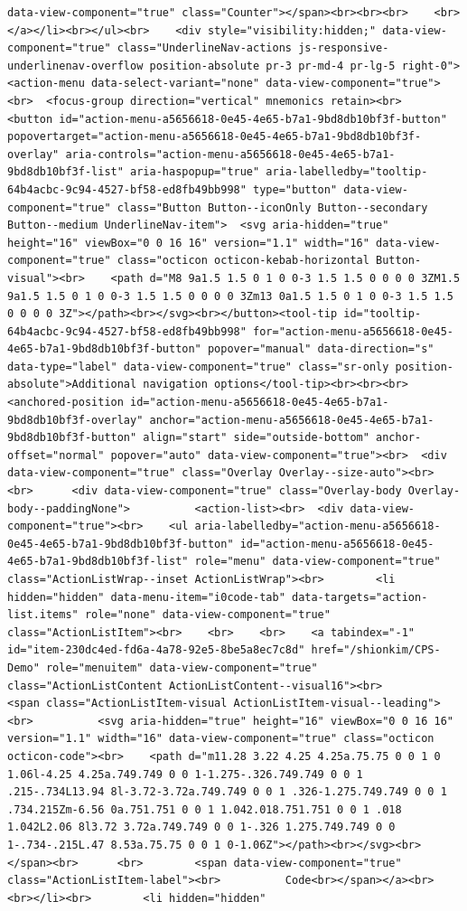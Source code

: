 \documentclass[
  letterpaper,
]{book}
\begin{document}
\begin{verbatim}
data-view-component="true" class="Counter"></span><br><br><br>    <br></a></li><br></ul><br>    <div style="visibility:hidden;" data-view-component="true" class="UnderlineNav-actions js-responsive-underlinenav-overflow position-absolute pr-3 pr-md-4 pr-lg-5 right-0">      <action-menu data-select-variant="none" data-view-component="true"><br>  <focus-group direction="vertical" mnemonics retain><br>    <button id="action-menu-a5656618-0e45-4e65-b7a1-9bd8db10bf3f-button" popovertarget="action-menu-a5656618-0e45-4e65-b7a1-9bd8db10bf3f-overlay" aria-controls="action-menu-a5656618-0e45-4e65-b7a1-9bd8db10bf3f-list" aria-haspopup="true" aria-labelledby="tooltip-64b4acbc-9c94-4527-bf58-ed8fb49bb998" type="button" data-view-component="true" class="Button Button--iconOnly Button--secondary Button--medium UnderlineNav-item">  <svg aria-hidden="true" height="16" viewBox="0 0 16 16" version="1.1" width="16" data-view-component="true" class="octicon octicon-kebab-horizontal Button-visual"><br>    <path d="M8 9a1.5 1.5 0 1 0 0-3 1.5 1.5 0 0 0 0 3ZM1.5 9a1.5 1.5 0 1 0 0-3 1.5 1.5 0 0 0 0 3Zm13 0a1.5 1.5 0 1 0 0-3 1.5 1.5 0 0 0 0 3Z"></path><br></svg><br></button><tool-tip id="tooltip-64b4acbc-9c94-4527-bf58-ed8fb49bb998" for="action-menu-a5656618-0e45-4e65-b7a1-9bd8db10bf3f-button" popover="manual" data-direction="s" data-type="label" data-view-component="true" class="sr-only position-absolute">Additional navigation options</tool-tip><br><br><br><anchored-position id="action-menu-a5656618-0e45-4e65-b7a1-9bd8db10bf3f-overlay" anchor="action-menu-a5656618-0e45-4e65-b7a1-9bd8db10bf3f-button" align="start" side="outside-bottom" anchor-offset="normal" popover="auto" data-view-component="true"><br>  <div data-view-component="true" class="Overlay Overlay--size-auto"><br>    <br>      <div data-view-component="true" class="Overlay-body Overlay-body--paddingNone">          <action-list><br>  <div data-view-component="true"><br>    <ul aria-labelledby="action-menu-a5656618-0e45-4e65-b7a1-9bd8db10bf3f-button" id="action-menu-a5656618-0e45-4e65-b7a1-9bd8db10bf3f-list" role="menu" data-view-component="true" class="ActionListWrap--inset ActionListWrap"><br>        <li hidden="hidden" data-menu-item="i0code-tab" data-targets="action-list.items" role="none" data-view-component="true" class="ActionListItem"><br>    <br>    <br>    <a tabindex="-1" id="item-230dc4ed-fd6a-4a78-92e5-8be5a8ec7c8d" href="/shionkim/CPS-Demo" role="menuitem" data-view-component="true" class="ActionListContent ActionListContent--visual16"><br>        <span class="ActionListItem-visual ActionListItem-visual--leading"><br>          <svg aria-hidden="true" height="16" viewBox="0 0 16 16" version="1.1" width="16" data-view-component="true" class="octicon octicon-code"><br>    <path d="m11.28 3.22 4.25 4.25a.75.75 0 0 1 0 1.06l-4.25 4.25a.749.749 0 0 1-1.275-.326.749.749 0 0 1 .215-.734L13.94 8l-3.72-3.72a.749.749 0 0 1 .326-1.275.749.749 0 0 1 .734.215Zm-6.56 0a.751.751 0 0 1 1.042.018.751.751 0 0 1 .018 1.042L2.06 8l3.72 3.72a.749.749 0 0 1-.326 1.275.749.749 0 0 1-.734-.215L.47 8.53a.75.75 0 0 1 0-1.06Z"></path><br></svg><br>        </span><br>      <br>        <span data-view-component="true" class="ActionListItem-label"><br>          Code<br></span></a><br>  <br></li><br>        <li hidden="hidden" 
\end{verbatim}
\end{document}
